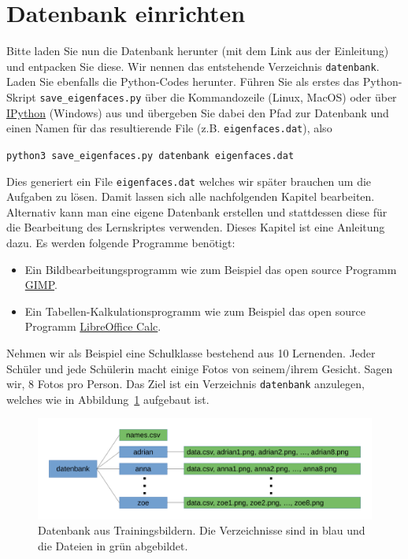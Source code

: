 \section{Datenbank einrichten} \label{sec:database}
Bitte laden Sie nun die Datenbank herunter (mit dem Link aus der Einleitung) und entpacken Sie diese.
Wir nennen das entstehende Verzeichnis \texttt{datenbank}.
Laden Sie ebenfalls die Python-Codes herunter.
Führen Sie als erstes das Python-Skript \texttt{save\_eigenfaces.py} über die Kommandozeile (Linux, MacOS) oder über \href{https://ipython.org/install.html}{IPython} (Windows) aus und übergeben Sie dabei den Pfad zur Datenbank und einen Namen für das resultierende File (z.B. \texttt{eigenfaces.dat}), also
\begin{center}
\texttt{python3 save_eigenfaces.py datenbank eigenfaces.dat}
\end{center}
Dies generiert ein File \texttt{eigenfaces.dat} welches wir später brauchen um die Aufgaben zu lösen.
Damit lassen sich alle nachfolgenden Kapitel bearbeiten.
Alternativ kann man eine eigene Datenbank erstellen und stattdessen diese für die Bearbeitung des Lernskriptes verwenden.
Dieses Kapitel ist eine Anleitung dazu.
Es werden folgende Programme benötigt:
\begin{itemize}
	\item Ein Bildbearbeitungsprogramm wie zum Beispiel das open source Programm \href{https://www.gimp.org/}{GIMP}.
	\item Ein Tabellen-Kalkulationsprogramm wie zum Beispiel das open source Programm \href{https://de.libreoffice.org/discover/calc/}{LibreOffice Calc}.
\end{itemize}
Nehmen wir als Beispiel eine Schulklasse bestehend aus 10 Lernenden.
Jeder Schüler und jede Schülerin macht einige Fotos von seinem/ihrem Gesicht.
Sagen wir, 8 Fotos pro Person.
Das Ziel ist ein Verzeichnis \texttt{datenbank} anzulegen, welches wie in Abbildung~\ref{fig:database} aufgebaut ist.
\begin{figure}[ht]
	\centering
	\includegraphics[width=\textwidth]{images/database}
	\caption{Datenbank aus Trainingsbildern. Die Verzeichnisse sind in blau und die Dateien in grün abgebildet.}
	\label{fig:database}
\end{figure}
